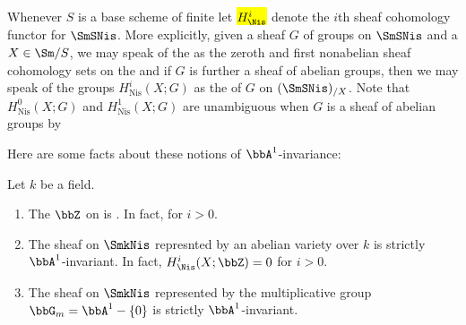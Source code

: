 \begin{notation} \label{notation:sheaf_cohomology_for_sheaves_of_groups_on_the_nisnevich_site_over_a_noetherian_finite_dimensional_scheme}
    Whenever $S$ is a  base scheme of finite  let \hl{$H^i_{\Nis}$} denote the $i$th sheaf cohomology functor for $\SmSNis$. More explicitly, given a sheaf $G$ of groups on $\SmSNis$ and a $X \in \Sm/S$, we may speak of the  as the zeroth and first nonabelian sheaf cohomology sets on the  and if $G$ is further a sheaf of abelian groups, then we may speak of the groups $H^i_{\mathrm{Nis}}(X;G)$ as the  of $G$ on $(\SmSNis)_{/X}$. Note that $H^0_{\mathrm{Nis}}(X;G)$ and $H^1_{\mathrm{Nis}}(X;G)$ are unambiguous when $G$ is a sheaf of abelian groups by 
\end{notation}





Here are some facts about these notions of $\bbA^1$-invariance:
\begin{example}
    Let $k$ be a field. 
\begin{enumerate}
    \item \cite[After Theorem 3.2]{morel_a1at_2006} The  $\bbZ$ on  is . In fact,  for $i > 0$.
    \item \cite[After Theorem 3.2]{morel_a1at_2006} The sheaf on $\SmkNis$ represnted by an abelian variety over $k$ is strictly $\bbA^1$-invariant. In fact, $H_{\Nis}^i(X;\bbZ) = 0$ for $i > 0$.
    \item \cite[After Theorem 3.2]{morel_a1at_2006} The sheaf on $\SmkNis$ represented by the multiplicative group $\bbG_m = \bbA^1 - \{0\}$ is strictly $\bbA^1$-invariant.
\end{enumerate}
\end{example}

